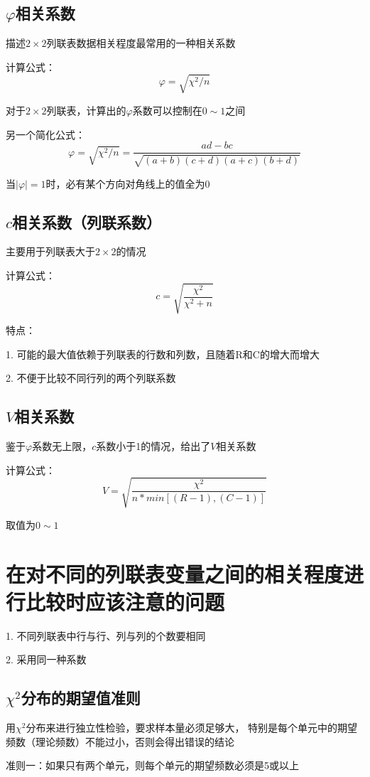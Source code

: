 \documentclass[UTF8,10pt]{book}
\begin{document}
{\subsection{$\varphi$相关系数}	
描述$2\times 2$列联表数据相关程度最常用的一种相关系数 

计算公式： $$\varphi = \sqrt{\chi^2/n}$$ 

对于$2\times 2$列联表，计算出的$\varphi$系数可以控制在$0\sim1$之间 

另一个简化公式： 
$$\varphi = \sqrt{\chi^2/n} = \frac{ad-bc}{\sqrt{(a+b)(c+d)(a+c)(b+d)}}$$ 

当$|\varphi|=1$时，必有某个方向对角线上的值全为0	


\subsection{$c$相关系数（列联系数）}	
主要用于列联表大于$2\times 2$的情况 

计算公式： $$c = \sqrt{ \frac{\chi^2}{\chi^2 + n} } $$ 

特点： 

1. 可能的最大值依赖于列联表的行数和列数，且随着R和C的增大而增大 

2. 不便于比较不同行列的两个列联系数	


\subsection{$V$相关系数}	
鉴于$\varphi$系数无上限，$c$系数小于1的情况，给出了$V$相关系数 

计算公式： 
$$V = \sqrt{\frac{\chi^2}{n*min[(R-1),(C-1)]}}$$ 

取值为$0 \sim 1$	

\section{在对不同的列联表变量之间的相关程度进行比较时应该注意的问题}	

1. 不同列联表中行与行、列与列的个数要相同 

2. 采用同一种系数	

\subsection{$\chi^2$分布的期望值准则}	

用$\chi^2$分布来进行独立性检验，要求样本量必须足够大，
特别是每个单元中的期望频数（理论频数）不能过小，否则会得出错误的结论 

准则一：如果只有两个单元，则每个单元的期望频数必须是5或以上 

}
\end{document}
